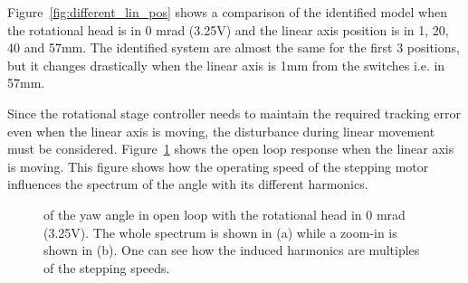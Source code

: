 Figure~\ref{fig:different_lin_pos} shows a comparison of the identified model when the rotational head is in 0 mrad (3.25V) and the linear axis position is in 1, 20, 40 and 57mm. The identified system are almost the same for the first 3 positions, but it changes drastically when the linear axis is 1mm from the switches i.e. in 57mm.

Since the rotational stage controller needs to maintain the required tracking error even when the linear axis is moving, the disturbance during linear movement must be considered. Figure~\ref{fig:dist_diff_speed} shows the open loop response when the linear axis is moving. This figure shows how the operating speed of the stepping motor influences the spectrum of the angle with its different harmonics.

\begin{figure}[h!]
  \centering %
  \qquad
  \caption{\label{fig:dist_diff_speed} \abbrFFT of the yaw angle in open loop with the rotational head in 0 mrad (3.25V). The whole spectrum is shown in (a) while a zoom-in is shown in (b). One can see how the induced harmonics are multiples of the stepping speeds.}
\end{figure}

